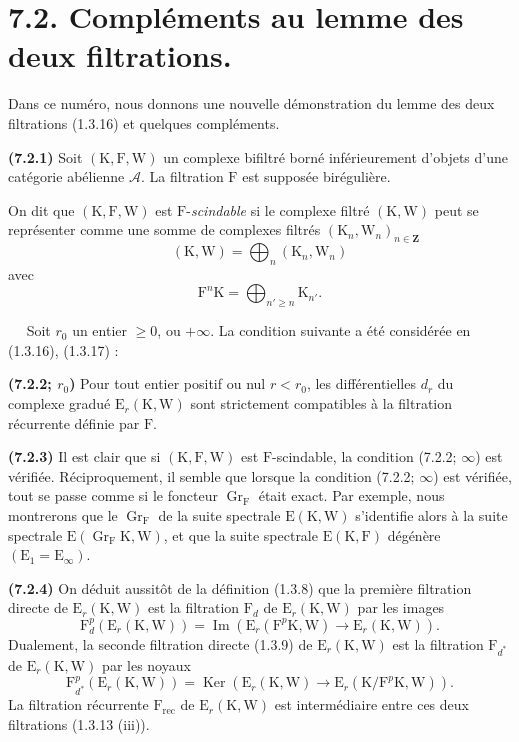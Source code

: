 \documentclass[11pt,leqno]{article}
\newcommand{\Page}[1]{\ifvmode\noindent\else\unskip\ \fi{\footnotesize\textcolor{gray}{[p.\,#1]}}\ \ignorespaces}
\begin{document}
\section*{7.2. Compléments au lemme des deux filtrations.}

Dans ce numéro, nous donnons une nouvelle démonstration du lemme des deux filtrations (1.3.16) et quelques compléments.

\textbf{(7.2.1)} Soit \((\mathrm{K},\mathrm{F},\mathrm{W})\) un complexe bifiltré borné inférieurement d’objets d’une catégorie abélienne \(\mathscr{A}\). La filtration \(\mathrm{F}\) est supposée birégulière.

On dit que \((\mathrm{K},\mathrm{F},\mathrm{W})\) est \(\mathrm{F}\)-\textit{scindable} si le complexe filtré \((\mathrm{K},\mathrm{W})\) peut se représenter comme une somme de complexes filtrés \((\mathrm{K}_n,\mathrm{W}_n)_{n\in\mathbf{Z}}\)
\[
(\mathrm{K},\mathrm{W})=\bigoplus_n(\mathrm{K}_n,\mathrm{W}_n)
\]
avec
\[
\mathrm{F}^{n}\mathrm{K}=\bigoplus_{n'\geq n}\mathrm{K}_{n'}.
\]

\Page{26}
Soit \(r_0\) un entier \(\geq 0\), ou \(+\infty\). La condition suivante a été considérée en (1.3.16), (1.3.17) :

\textbf{(7.2.2; \(r_0\))} Pour tout entier positif ou nul \(r<r_0\), les différentielles \(d_r\) du complexe gradué \(\mathrm{E}_r(\mathrm{K},\mathrm{W})\) sont strictement compatibles à la filtration récurrente définie par \(\mathrm{F}\).

\textbf{(7.2.3)} Il est clair que si \((\mathrm{K},\mathrm{F},\mathrm{W})\) est \(\mathrm{F}\)-scindable, la condition (7.2.2; \(\infty\)) est vérifiée. Réciproquement, il semble que lorsque la condition (7.2.2; \(\infty\)) est vérifiée, tout se passe comme si le foncteur \(\operatorname{Gr}_{\mathrm{F}}\) était exact. Par exemple, nous montrerons que le \(\operatorname{Gr}_{\mathrm{F}}\) de la suite spectrale \(\mathrm{E}(\mathrm{K},\mathrm{W})\) s’identifie alors à la suite spectrale \(\mathrm{E}(\operatorname{Gr}_{\mathrm{F}}\mathrm{K},\mathrm{W})\), et que la suite spectrale \(\mathrm{E}(\mathrm{K},\mathrm{F})\) dégénère \((\mathrm{E}_1=\mathrm{E}_{\infty})\).

\textbf{(7.2.4)} On déduit aussitôt de la définition (1.3.8) que la première filtration directe de \(\mathrm{E}_r(\mathrm{K},\mathrm{W})\) est la filtration \(\mathrm{F}_d\) de \(\mathrm{E}_r(\mathrm{K},\mathrm{W})\) par les images
\[
\mathrm{F}_d^p(\mathrm{E}_r(\mathrm{K},\mathrm{W}))
=\operatorname{Im}(\mathrm{E}_r(\mathrm{F}^p\mathrm{K},\mathrm{W})
\to\mathrm{E}_r(\mathrm{K},\mathrm{W})).
\]
Dualement, la seconde filtration directe (1.3.9) de \(\mathrm{E}_r(\mathrm{K},\mathrm{W})\) est la filtration \(\mathrm{F}_{d^{*}}\) de \(\mathrm{E}_r(\mathrm{K},\mathrm{W})\) par les noyaux
\[
\mathrm{F}_{d^{*}}^p(\mathrm{E}_r(\mathrm{K},\mathrm{W}))
=\operatorname{Ker}(\mathrm{E}_r(\mathrm{K},\mathrm{W})
\to\mathrm{E}_r(\mathrm{K}/\mathrm{F}^p\mathrm{K},\mathrm{W})).
\]
La filtration récurrente \(\mathrm{F}_{\mathrm{rec}}\) de \(\mathrm{E}_r(\mathrm{K},\mathrm{W})\) est intermédiaire entre ces deux filtrations (1.3.13 (iii)).
\end{document}
